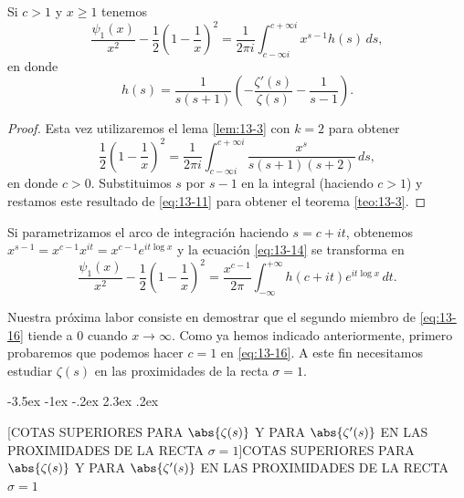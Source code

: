 \documentclass[12pt,a4paper]{book}
\makeatletter
\renewcommand\section{\@startsection{section}{1}{\z@}%
  {-3.5ex \@plus -1ex \@minus -.2ex}%
  {2.3ex \@plus .2ex}%
  {\normalfont\Large\bfseries\raggedright}}
\makeatother
\begin{document}
    \begin{teorema}\label{teo:13-3}
        Si $c>1$ y $x\geq1$ tenemos
        \begin{equation}\label{eq:13-14}
            \frac{\psi_{1}(x)}{x^{2}}-\frac{1}{2}\left(1-\frac{1}{x}\right)^{2}=\frac{1}{2\pi i}\int_{c-\infty i}^{c+\infty i}x^{s-1}h(s)\,ds,
        \end{equation}
        en donde
        \begin{equation}\label{eq:13-15}
            h(s)=\frac{1}{s(s+1)}\left(-\frac{\zeta'(s)}{\zeta(s)}-\frac{1}{s-1}\right).
        \end{equation}
    \end{teorema}

    \begin{proof}
        Esta vez utilizaremos el lema \ref{lem:13-3} con $k=2$ para obtener
        \begin{equation*}
            \frac{1}{2}\left(1-\frac{1}{x}\right)^{2}=\frac{1}{2\pi i}\int_{c-\infty i}^{c+\infty i}\frac{x^{s}}{s(s+1)(s+2)}\,ds,
        \end{equation*}
        en donde $c>0$. Substituimos $s$ por $s-1$ en la integral (haciendo $c>1$) y restamos
        este resultado de \eqref{eq:13-11} para obtener el teorema \ref{teo:13-3}.
    \end{proof}

    Si parametrizamos el arco de integración haciendo $s=c+it$, obtenemos
    $x^{s-1}=x^{c-1}x^{it}=x^{c-1}e^{it\log x}$ y la ecuación \eqref{eq:13-14} se transforma
    en
    \begin{equation}\label{eq:13-16}
        \frac{\psi_{1}(x)}{x^{2}}-\frac{1}{2}\left(1-\frac{1}{x}\right)^{2}=\frac{x^{c-1}}{2\pi}\int_{-\infty}^{+\infty}h(c+it)e^{it\log x}\,dt.
    \end{equation}

    Nuestra próxima labor consiste en demostrar que el segundo miembro de
    \eqref{eq:13-16} tiende a 0 cuando $x\to\infty$. Como ya hemos indicado anteriormente,
    primero probaremos que podemos hacer $c=1$ en \eqref{eq:13-16}. A este fin necesitamos
    estudiar $\zeta(s)$ en las proximidades de la recta $\sigma=1$.

    \section[COTAS SUPERIORES PARA \texorpdfstring{$\abs{\zeta(s)}$}{|ζ(s)|} Y PARA \texorpdfstring{$\abs{\zeta'(s)}$}{|ζ'(s)|} EN LAS PROXIMIDADES DE LA RECTA \texorpdfstring{$\sigma=1$}{σ=1}]{COTAS SUPERIORES PARA \texorpdfstring{$\abs{\zeta(s)}$}{|ζ(s)|} Y PARA \texorpdfstring{$\abs{\zeta'(s)}$}{|ζ'(s)|} EN LAS PROXIMIDADES DE LA RECTA \texorpdfstring{$\sigma=1$}{σ=1}}
\end{document}
